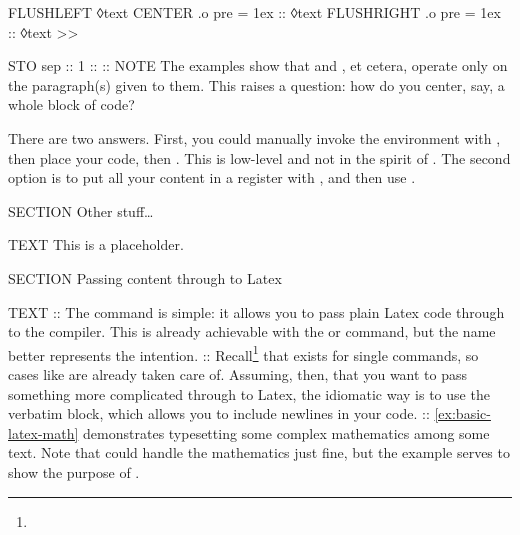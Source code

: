 \begin{lbt}
      FLUSHLEFT ◊text
      CENTER .o pre = 1ex :: ◊text
      FLUSHRIGHT .o pre = 1ex :: ◊text
    >>

    STO sep :: 1 :: {:}{:}
    NOTE The examples show that  and , et cetera, operate only on the paragraph(s) given to them. This raises a question: how do you center, say, a whole block of \lbtlogo{} code? \par There are two answers. First, you could manually invoke the  environment with , then place your code, then . This is low-level and not in the spirit of \lbtlogo. The second option is to put all your content in a register with , and then use . \par {}


    SECTION Other stuff\dots

    TEXT This is a placeholder.

    SECTION Passing content through to Latex

    TEXT
    :: The  command is simple: it allows you to pass plain Latex code through to the compiler. This is already achievable with the  or  command, but the name  better represents the intention.
    :: Recall\footnote{} that  exists for single commands, so cases like  are already taken care of. Assuming, then, that you want to pass something more complicated through to Latex, the idiomatic way is to use the  verbatim block, which allows you to include newlines in your code.
    :: \cref{ex:basic-latex-math} demonstrates typesetting some complex mathematics among some text. Note that  could handle the mathematics just fine, but the example serves to show the purpose of .


\end{lbt}
